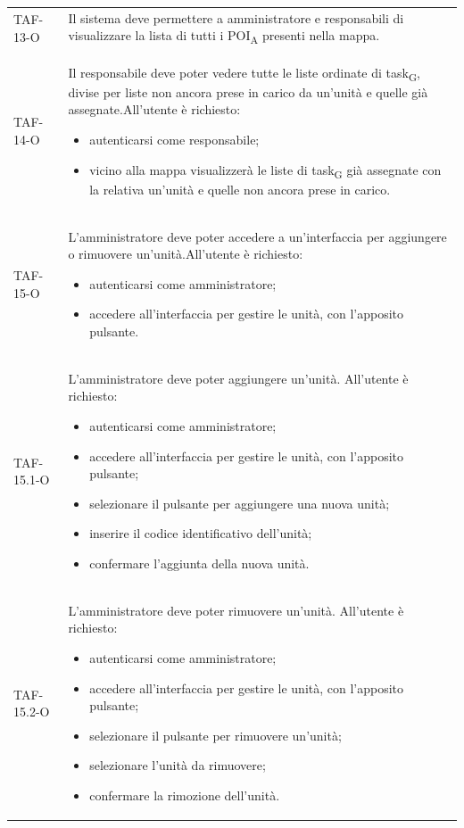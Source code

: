 \begin{longtable}{ >{\centering}p{} >{}p{}}
	TAF-13-O & Il sistema deve permettere a amministratore e responsabili di visualizzare la lista di tutti i POI\textsubscript{A} presenti nella mappa.\tabularnewline

	TAF-14-O & Il responsabile deve poter vedere tutte le liste ordinate di task\textsubscript{G}, divise per liste non ancora prese in carico da un'unità e quelle già assegnate.\newline All'utente è richiesto:\begin{itemize} \item autenticarsi come responsabile; \item vicino alla mappa visualizzerà le liste di task\textsubscript{G} già assegnate con la relativa un'unità e quelle non ancora prese in carico. \end{itemize}\tabularnewline

	TAF-15-O & L'amministratore deve poter accedere a un'interfaccia per aggiungere o rimuovere un'unità.\newline All'utente è richiesto: \begin{itemize} \item autenticarsi come amministratore; \item accedere all'interfaccia per gestire le unità, con l'apposito pulsante.\end{itemize}\tabularnewline
	TAF-15.1-O & L'amministratore deve poter aggiungere un'unità. \newline All'utente è richiesto: \begin{itemize} \item autenticarsi come amministratore; \item accedere all'interfaccia per gestire le unità, con l'apposito pulsante; \item selezionare il pulsante per aggiungere una nuova unità; \item inserire il codice identificativo dell'unità; \item confermare l'aggiunta della nuova unità.\end{itemize}\tabularnewline

	TAF-15.2-O & L'amministratore deve poter rimuovere un'unità. \newline All'utente è richiesto: \begin{itemize} \item autenticarsi come amministratore; \item accedere all'interfaccia per gestire le unità, con l'apposito pulsante; \item selezionare il pulsante per rimuovere un'unità; \item selezionare l'unità da rimuovere; \item confermare la rimozione dell'unità.\end{itemize}\tabularnewline


\end{longtable}
